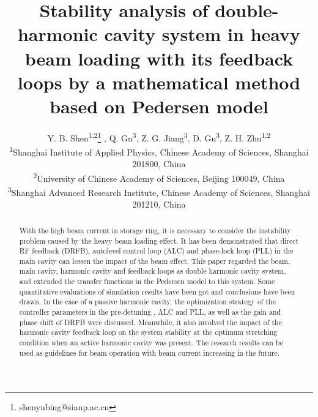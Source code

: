 \documentclass[letterpaper,
               nospread,     %
               ]{jacow}
\begin{document}
\title{Stability analysis of double-harmonic cavity system in heavy beam
   loading with its feedback loops by a mathematical method based on Pedersen model}
\author{Y. B. Shen\textsuperscript{1,2}\thanks{shenyubing@sianp.ac.cn}
   , Q. Gu\textsuperscript{3}, Z. G. Jiang\textsuperscript{3}, D. Gu\textsuperscript{3}, Z. H. Zhu\textsuperscript{1,2}\\
   \textsuperscript{1}Shanghai Institute of Applied Physics, Chinese Academy of Sciences, Shanghai 201800, China\\
   \textsuperscript{2}University of Chinese Academy of Sciences, Beijing 100049, China\\
   \textsuperscript{3}Shanghai Advanced Research Institute, Chinese Academy of Sciences, Shanghai 201210, China}
\maketitle

\begin{abstract}
   With the high beam current in storage ring, it is necessary to consider
   the instability problem caused by the heavy beam loading effect. It has
   been demonstrated that direct RF feedback (DRFB), autolevel control
   loop (ALC) and phase-lock loop (PLL) in the main cavity can lessen
   the impact of the beam effect. This paper regarded the beam, main
   cavity, harmonic cavity and feedback loops as double harmonic cavity
   system, and extended the transfer functions in the Pedersen model to
   this system. Some quantitative evaluations of simulation results have
   been got and conclusions have been drawn. In the case of a passive
   harmonic cavity, the optimization strategy of the controller parameters
   in the pre-detuning , ALC and PLL, as well as the gain and phase shift
   of DRFB were discussed. Meanwhile, it also involved the impact of the
   harmonic cavity feedback loop on the system stability at the optimum
   stretching condition when an active harmonic cavity was present.
   The research results can be used as guidelines for beam operation
   with beam current increasing in the future.
\end{abstract}
\end{document}

